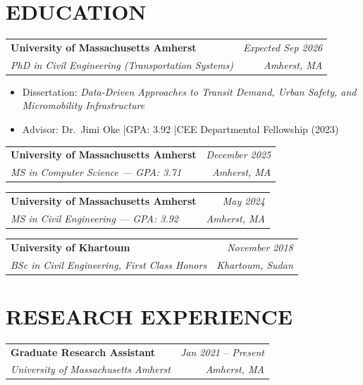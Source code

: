 \documentclass[10pt, a4paper]{article}
\makeatletter
\newcommand{\entry}[4]{%
  \noindent
  \begin{tabularx}{\linewidth}{@{}X@{\hspace{4pt}}r@{}}
    \textbf{#1} & \textit{\small\color{subtle}#2} \\
    \textit{\small\color{subtle}#3} & \textit{\small\color{subtle}#4}
  \end{tabularx}\vspace{2pt}%
}
\makeatother
\begin{document}
\section{EDUCATION}

\entry{University of Massachusetts Amherst}{Expected Sep 2026}
      {PhD in Civil Engineering (Transportation Systems)}{Amherst, MA}
\begin{itemize}
  \item Dissertation: \textit{Data-Driven Approaches to Transit Demand, Urban Safety, and Micromobility Infrastructure}
  \item Advisor: Dr.\ Jimi Oke \quad|\quad GPA: 3.92 \quad|\quad CEE Departmental Fellowship (2023)
\end{itemize}
\vspace{3pt}
\entry{University of Massachusetts Amherst}{December 2025}
      {MS in Computer Science --- GPA: 3.71}{Amherst, MA}
\vspace{3pt}
\entry{University of Massachusetts Amherst}{May 2024}
      {MS in Civil Engineering --- GPA: 3.92}{Amherst, MA}
\vspace{6pt}
\entry{University of Khartoum}{November 2018}
      {BSc in Civil Engineering, First Class Honors}{Khartoum, Sudan}

\section{RESEARCH EXPERIENCE}

\entry{Graduate Research Assistant}{Jan 2021 -- Present}
      {University of Massachusetts Amherst}{Amherst, MA}
\end{document}
